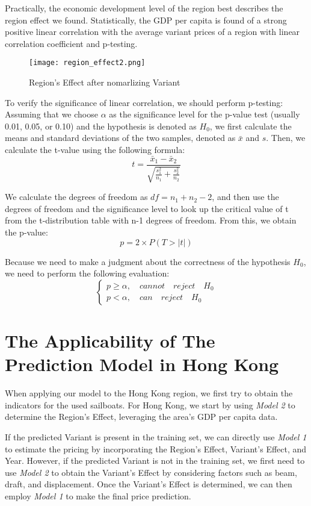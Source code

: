 \documentclass[12pt]{article}  %
\begin{document}
Practically, the economic development level of the region best describes the region effect we found. Statistically, the GDP per capita is found of a strong positive linear correlation with the average variant prices of a region with linear correlation coefficient and p-testing.


\begin{figure}[htbp]
    \centering
    \texttt{[image: region\_effect2.png]}
    \caption{Region's Effect after nomarlizing Variant}\label{fig:region_effect2}
\end{figure}

To verify the significance of linear correlation, we should perform p-testing:
Assuming that we choose $\alpha$ as the significance level for the p-value test (usually 0.01, 0.05, or 0.10) and the hypothesis is denoted as $H_0$, we first calculate the means and standard deviations of the two samples, denoted as $\bar{x}$ and $s$. Then, we calculate the t-value using the following formula:
$$t=\frac{\bar{x}_1-\bar{x}_2}{\sqrt{\frac{s_1^2}{n_1}+\frac{s_2^2}{n_2}}}$$

We calculate the degrees of freedom as $df = n_1 + n_2 - 2$, and then use the degrees of freedom and the significance level to look up the critical value of t from the t-distribution table with n-1 degrees of freedom. From this, we obtain the p-value:
$$p=2\times P(T>|t|)$$

Because we need to make a judgment about the correctness of the hypothesis $H_0$, we need to perform the following evaluation:
$$\begin{cases}
    p \geq\alpha ,\quad cannot \quad reject\quad H_0\\p<\alpha,\quad can \quad reject\quad H_0
    \end{cases}$$

\section{The Applicability of The Prediction Model in Hong Kong}
When applying our model to the Hong Kong region, 
we first try to obtain the indicators for the used sailboats. 
For Hong Kong, we start by using \emph{Model 2} to determine the Region's Effect, leveraging the area's GDP per capita data.

If the predicted Variant is present in the training set, 
we can directly use \emph{Model 1} to estimate the pricing by incorporating the Region's Effect, Variant's Effect, and Year. 
However, if the predicted Variant is not in the training set, we first need to use \emph{Model 2} to obtain the Variant's Effect by considering factors such as beam, draft, and displacement. 
Once the Variant's Effect is determined, we can then employ \emph{Model 1} to make the final price prediction.
\end{document}
